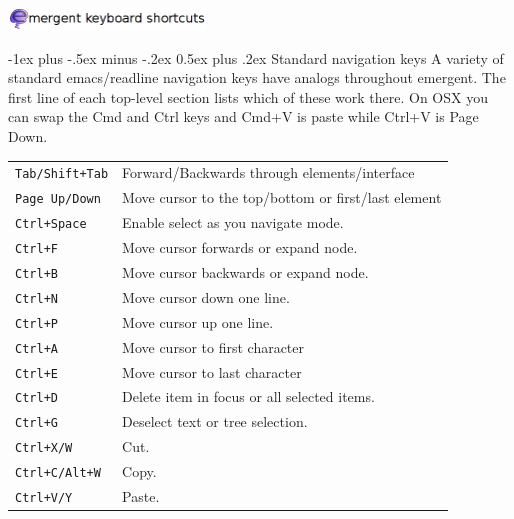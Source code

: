 \documentclass[10pt,landscape]{article}
\makeatletter
\renewcommand{\section}{\@startsection{section}{1}{0mm}%
                                {-1ex plus -.5ex minus -.2ex}%
                                {0.5ex plus .2ex}%
                                {\normalfont\large\bfseries}}
\makeatother
\begin{document}
\raggedright
\footnotesize
\begin{multicols}{3}

\setlength{\premulticols}{1pt}
\setlength{\postmulticols}{1pt}
\setlength{\multicolsep}{1pt}
\setlength{\columnsep}{2pt}

\begin{center}\includegraphics[width=198.5px]{header.png}\end{center}

\section{Standard navigation keys}
A variety of standard emacs/readline navigation keys have analogs
throughout emergent. The first line of each top-level section lists
which of these work there. On OSX you can swap the Cmd and Ctrl keys
and Cmd+V is paste while Ctrl+V is Page Down. \\
\begin{tabular}{@{}ll@{}}
\\
\verb!Tab/Shift+Tab! & Forward/Backwards through elements/interface \\
\verb!Page Up/Down!    & Move cursor to the top/bottom or first/last element\\
\verb!Ctrl+Space!    & Enable select as you navigate mode. \\
\verb!Ctrl+F!    & Move cursor forwards or expand node. \\
\verb!Ctrl+B!    & Move cursor backwards or expand node. \\
\verb!Ctrl+N!    & Move cursor down one line. \\
\verb!Ctrl+P!    & Move cursor up one line. \\
\verb!Ctrl+A!    & Move cursor to first character \\
\verb!Ctrl+E!    & Move cursor to last character \\
\verb!Ctrl+D!  & Delete item in focus or all selected items. \\
\verb!Ctrl+G!  & Deselect text or tree selection. \\
\verb!Ctrl+X/W! & Cut. \\
\verb!Ctrl+C/Alt+W! & Copy. \\
\verb!Ctrl+V/Y! & Paste.
\end{tabular}


\end{multicols}
\end{document}
